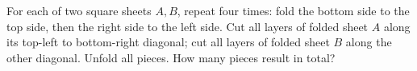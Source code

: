 For each of two square sheets $A,B$, repeat four times: fold the bottom side to the top side, then the right side to the left side. Cut all layers of folded sheet $A$ along its top-left to bottom-right diagonal; cut all layers of folded sheet $B$ along the other diagonal. Unfold all pieces. How many pieces result in total?
